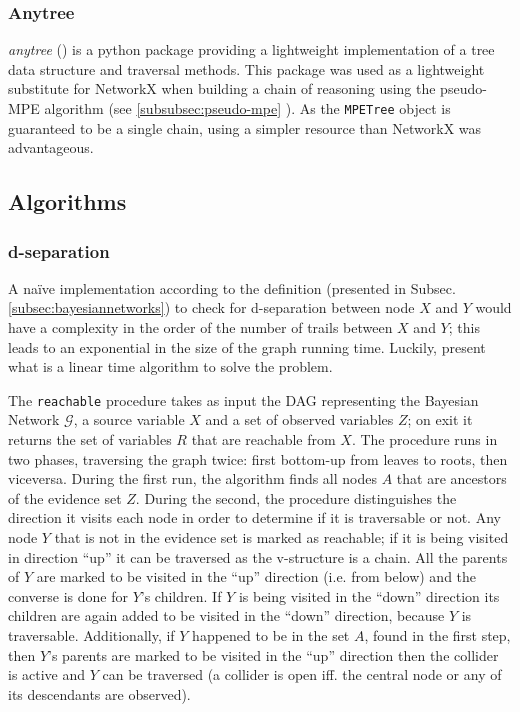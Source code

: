 \subsubsection{Anytree}
\textit{anytree} (\cite{anytree}) is a python package providing a lightweight implementation of a tree data structure and traversal methods.
This package was used as a lightweight substitute for NetworkX when building a chain of reasoning using the pseudo-MPE algorithm (see \ref{subsubsec:pseudo-mpe} ).
As the \texttt{MPETree} object is guaranteed to be a single chain, using a simpler resource than NetworkX was advantageous.

\subsection{Algorithms}
\subsubsection{d-separation}
A na{\"i}ve implementation according to the definition (presented in Subsec. \ref{subsec:bayesiannetworks}) to check for d-separation between node $X$ and $Y$ would have a complexity in the order of the number of trails between $X$ and $Y$; this leads to an exponential in the size of the graph running time.
Luckily, \cite{koller2007dseparation} present what is a linear time algorithm to solve the problem.

The \texttt{reachable} procedure takes as input the DAG representing the Bayesian Network $\mathcal{G}$, a source variable $X$ and a set of observed variables $Z$; on exit it returns the set of variables $R$ that are reachable from $X$.
The procedure runs in two phases, traversing the graph twice: first bottom-up from leaves to roots, then viceversa.
During the first run, the algorithm finds all nodes $A$ that are ancestors of the evidence set $Z$.
During the second, the procedure distinguishes the direction it visits each node in order to determine if it is traversable or not.
Any node $Y$ that is not in the evidence set is marked as reachable; if it is being visited in direction \enquote{up} it can be traversed as the v-structure is a chain.
All the parents of $Y$ are marked to be visited in the \enquote{up} direction (i.e. from below) and the converse is done for $Y$'s children.
If $Y$ is being visited in the \enquote{down} direction its children are again added to be visited in the \enquote{down} direction, because $Y$ is traversable.
Additionally, if $Y$ happened to be in the set $A$, found in the first step, then $Y$'s parents are marked to be visited in the \enquote{up} direction then the collider is active and $Y$ can be traversed (a collider is open iff. the central node or any of its descendants are observed).

